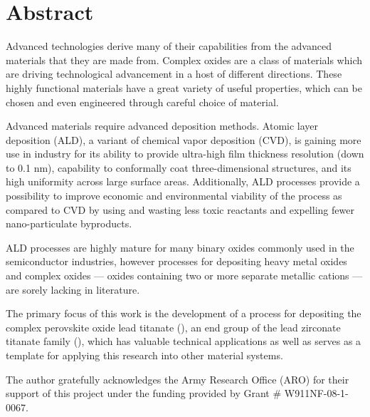 \newpage
\chapter*{Abstract}


Advanced technologies derive many of their capabilities from the advanced materials that they are made from. Complex oxides are a class of materials which are driving technological advancement in a host of different directions. These highly functional materials have a great variety of useful properties, which can be chosen and even engineered through careful choice of material. 

Advanced materials require advanced deposition methods. Atomic layer deposition (ALD), a variant of chemical vapor deposition (CVD), is gaining more use in industry for its ability to provide ultra-high film thickness resolution (down to 0.1 nm), capability to conformally coat three-dimensional structures, and its high uniformity across large surface areas. Additionally, ALD processes provide a possibility to improve economic and environmental viability of the process as compared to CVD by using and wasting less toxic reactants and expelling fewer nano-particulate byproducts. 

ALD processes are highly mature for many binary oxides commonly used in the semiconductor industries, however processes for depositing heavy metal oxides and complex oxides --- oxides containing two or more separate metallic cations --- are sorely lacking in literature. 

The primary focus of this work is the development of a process for depositing the complex perovskite oxide lead titanate (\PTO{}), an end group of the lead zirconate titanate family (), which has valuable technical applications as well as serves as a template for applying this research into other material systems. 

The author gratefully acknowledges the Army Research Office (ARO) for their support of this project under the funding provided by Grant \# W911NF-08-1-0067.


